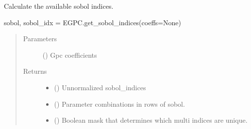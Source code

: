 \documentclass[letterpaper,10pt,english,openany,oneside]{sphinxmanual}
\begin{document}
\begin{fulllineitems}

\begin{fulllineitems}
\label{\detokenize{pygpc:pygpc.EGPC.EGPC.get_sobol_indices}}
Calculate the available sobol indices.

sobol, sobol\_idx = EGPC.get\_sobol\_indices(coeffs=None)
\begin{quote}\begin{description}
\item[{Parameters}] \leavevmode
{} (\sphinxstyleliteralemphasis{\sphinxupquote{{[}}}\sphinxstyleliteralemphasis{\sphinxupquote{{]} }}\sphinxstyleliteralemphasis{\sphinxupquote{, }}\sphinxstyleliteralemphasis{\sphinxupquote{, }}) \textendash{} Gpc coefficients

\item[{Returns}] \leavevmode
\begin{itemize}
\item {} 
 () \textendash{} Unnormalized sobol\_indices

\item {} 
 () \textendash{} Parameter combinations in rows of sobol.

\item {} 
 () \textendash{} Boolean mask that determines which multi indices are unique.

\end{itemize}


\end{description}\end{quote}

\end{fulllineitems}



\end{fulllineitems}
\end{document}
